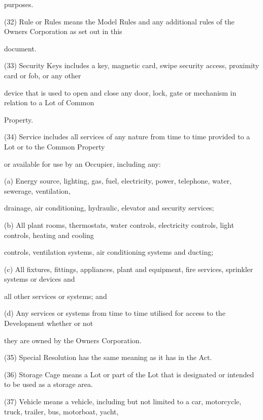 \documentclass{article}
\begin{document}
{\fontsize{10.02}{1}purposes. }

{\fontsize{9.962}{1}(32) Rule or Rules means the Model Rules and any additional rules of the Owners Corporation as set out in this }

{\fontsize{10.02}{1}document. }

{\fontsize{9.962}{1}(33) Security Keys includes a key, magnetic card, swipe security access, proximity card or fob, or any other }

{\fontsize{10.02}{1}device that is used to open and close any door, lock, gate or mechanism in relation to a Lot of Common }

{\fontsize{10.02}{1}Property. }

{\fontsize{9.962}{1}(34) Service includes all services of any nature from time to time provided to a Lot or to the Common Property }

{\fontsize{10.02}{1}or available for use by an Occupier, including any: }

{\fontsize{9.962}{1}(a) Energy source, lighting, gas, fuel, electricity, power, telephone, water, sewerage, ventilation, }

{\fontsize{10.02}{1}drainage, air conditioning, hydraulic, elevator and security services; }

{\fontsize{9.962}{1}(b) All plant rooms, thermostats, water controls, electricity controls, light controls, heating and cooling }

{\fontsize{10.02}{1}controls, ventilation systems, air conditioning systems and ducting; }

{\fontsize{9.962}{1}(c) All fixtures, fittings, appliances, plant and equipment, fire services, sprinkler systems or devices and }

{\fontsize{10.02}{1}all other services or systems; and }

{\fontsize{9.962}{1}(d) Any services or systems from time to time utilised for access to the Development whether or not }

{\fontsize{10.02}{1}they are owned by the Owners Corporation. }

{\fontsize{9.962}{1}(35) Special Resolution has the same meaning as it has in the Act. }

{\fontsize{9.962}{1}(36) Storage Cage means a Lot or part of the Lot that is designated or intended to be used as a storage area. }

{\fontsize{9.962}{1}(37) Vehicle means a vehicle, including but not limited to a car, motorcycle, truck, trailer, bus, motorboat, yacht, }
\end{document}
